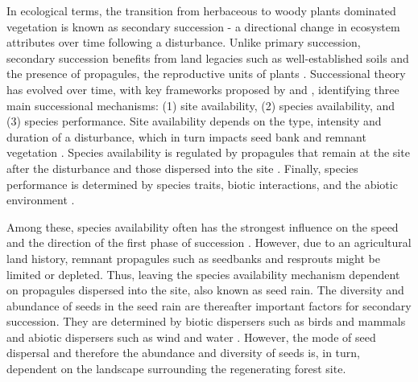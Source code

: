 In ecological terms, the transition from herbaceous to woody plants dominated vegetation is known as secondary succession - a directional change in ecosystem attributes over time following a disturbance. Unlike primary succession, secondary succession benefits from land legacies such as well-established soils and the presence of propagules, the reproductive units of plants \citep{poorterSuccessionalTheories2023}. %
Successional theory has evolved over time, with 
key frameworks proposed by \citet{pickettHierarchicalConsiderationCauses1987} and \citet{poorterComprehensiveFrameworkVegetation2024}, identifying three main successional mechanisms: (1) site availability, (2) species availability, and (3) species performance. Site availability depends on the type, intensity and duration of a disturbance, which in turn impacts seed bank and remnant vegetation \citep{poorterComprehensiveFrameworkVegetation2024}. Species availability is regulated by propagules that remain at the site after the disturbance and those dispersed into the site \citep{gleasonIndividualisticConceptPlant1926, dentUnitingNicheDifferentiation2021}. Finally, species performance is determined by species traits, biotic interactions, and the abiotic environment \citep{poorterComprehensiveFrameworkVegetation2024}. 

Among these, species availability often has the strongest influence on the speed and the direction of the first phase of succession \citep{poorterSuccessionalTheories2023, dentUnitingNicheDifferentiation2021}. However, due to an agricultural land history, remnant propagules such as seedbanks and resprouts might be limited or depleted. Thus, leaving the species availability mechanism dependent on propagules dispersed into the site, also known as seed rain. The diversity and abundance of seeds in the seed rain are thereafter important factors for secondary succession. They are determined by biotic dispersers such as birds and mammals and abiotic dispersers such as wind and water \citep{poorterComprehensiveFrameworkVegetation2024}. However, the mode of seed dispersal and therefore the abundance and diversity of seeds is, in turn, dependent on the landscape surrounding the regenerating forest site. 


